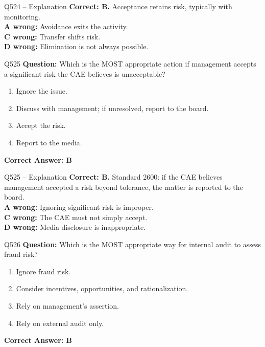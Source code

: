 \documentclass[aspectratio=169,10pt]{beamer}
\begin{document}
	\begin{frame}[t]{Q524 -- Explanation}
		\small
		\textbf{Correct: B.} Acceptance retains risk, typically with monitoring. \\[4pt]
		\textbf{A wrong:} Avoidance exits the activity. \\[2pt]
		\textbf{C wrong:} Transfer shifts risk. \\[2pt]
		\textbf{D wrong:} Elimination is not always possible.
	\end{frame}
	
	\begin{frame}[t]{Q525}
		\small
		\textbf{Question:} Which is the MOST appropriate action if management accepts a significant risk the CAE believes is unacceptable?
		\begin{enumerate}[label=\Alph*.,itemsep=1pt,topsep=2pt]
			\item Ignore the issue.
			\item Discuss with management; if unresolved, report to the board.
			\item Accept the risk.
			\item Report to the media.
		\end{enumerate}
		\vspace{4pt}
		\textbf{Correct Answer: B}
	\end{frame}
	
	\begin{frame}[t]{Q525 -- Explanation}
		\small
		\textbf{Correct: B.} Standard 2600: if the CAE believes management accepted a risk beyond tolerance, the matter is reported to the board. \\[4pt]
		\textbf{A wrong:} Ignoring significant risk is improper. \\[2pt]
		\textbf{C wrong:} The CAE must not simply accept. \\[2pt]
		\textbf{D wrong:} Media disclosure is inappropriate.
	\end{frame}
	
	\begin{frame}[t]{Q526}
		\small
		\textbf{Question:} Which is the MOST appropriate way for internal audit to assess fraud risk?
		\begin{enumerate}[label=\Alph*.,itemsep=1pt,topsep=2pt]
			\item Ignore fraud risk.
			\item Consider incentives, opportunities, and rationalization.
			\item Rely on management's assertion.
			\item Rely on external audit only.
		\end{enumerate}
		\vspace{4pt}
		\textbf{Correct Answer: B}
	\end{frame}
	
\end{document}
